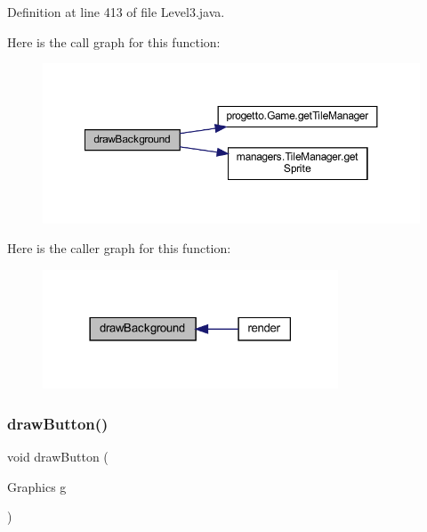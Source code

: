 Definition at line 413 of file Level3.\+java.

Here is the call graph for this function\+:\nopagebreak
\begin{figure}[H]
\begin{center}
\leavevmode
\includegraphics[width=350pt]{classscenes_1_1_level3_a62bcb07be9e39896e5837a9d396e7235_cgraph}
\end{center}
\end{figure}
Here is the caller graph for this function\+:\nopagebreak
\begin{figure}[H]
\begin{center}
\leavevmode
\includegraphics[width=249pt]{classscenes_1_1_level3_a62bcb07be9e39896e5837a9d396e7235_icgraph}
\end{center}
\end{figure}
\mbox{\label{classscenes_1_1_level3_a65768678909bc0512c6cb9780709ad38}} 
\subsubsection{\texorpdfstring{draw\+Button()}{drawButton()}}
{\footnotesize\ttfamily void draw\+Button (\begin{DoxyParamCaption}\item[{Graphics}]{g }\end{DoxyParamCaption})\hspace{0.3cm}{\ttfamily [private]}}



